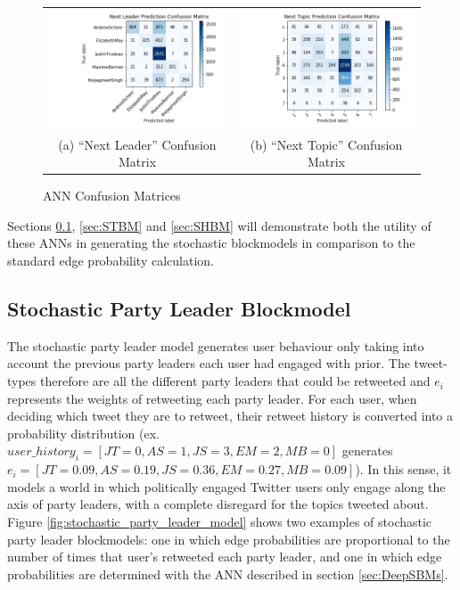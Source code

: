 \begin{singlespacing}
    \begin{figure}
        \centering
        \begin{tabular}{cc}
          \includegraphics[width=60mm]{Figures/next_leader_CM}
          &
          \includegraphics[width=60mm]{Figures/next_topic_CM}
          \\
        (a) ``Next Leader'' Confusion Matrix & (b) ``Next Topic'' Confusion Matrix \\[6pt]
        \end{tabular}
        \caption[ANN Confusion Matrices]{ANN Confusion Matrices}
        \label{fig:confusion_matrices}
    \end{figure}
\end{singlespacing}

Sections \ref{sec:SPLBM}, \ref{sec:STBM} and \ref{sec:SHBM} will demonstrate
both the utility of these ANNs in generating the stochastic blockmodels in
comparison to the standard edge probability calculation.

\subsection{Stochastic Party Leader Blockmodel}\label{sec:SPLBM}

The stochastic party leader model generates user behaviour only taking into
account the previous party leaders each user had engaged with prior. The
tweet-types therefore are all the different party leaders that could be
retweeted and $e_{i}$ represents the weights of retweeting each party leader.
For each user, when deciding which tweet they are to retweet, their retweet
history is converted into a probability distribution (ex.\
$user\_history_{i}=[JT=0,AS=1,JS=3,EM=2,MB=0]$ generates
$e_{i}=[JT=0.09,AS=0.19,JS=0.36,EM=0.27,MB=0.09]$). In this sense, it models a
world in which politically engaged Twitter users only engage along the axis of
party leaders, with a complete disregard for the topics tweeted about. Figure
\ref{fig:stochastic_party_leader_model} shows two examples of stochastic party
leader blockmodels: one in which edge probabilities are proportional to the
number of times that user's retweeted each party leader, and one in which edge
probabilities are determined with the ANN described in section
\ref{sec:DeepSBMs}.

